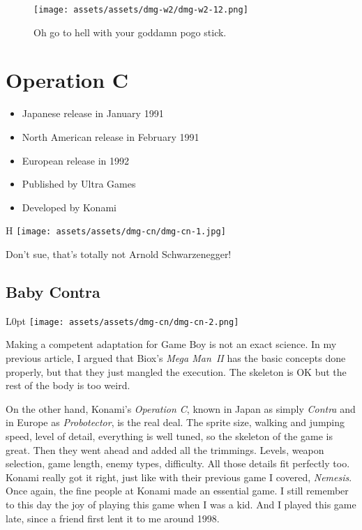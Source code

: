 \documentclass{book}
\begin{document}
\begin{figure}[hbt]
\vskip 10pt
\centering \texttt{[image: assets/assets/dmg-w2/dmg-w2-12.png]}\par\pagetwodescription Oh go to hell with your goddamn pogo stick.
\vskip 6pt
\end{figure}


\begingroup \chapter*{Operation C} \endgroup

\begin{itemize} \setlength\itemsep{-0.4em}
\item Japanese release in January 1991
\item North American release in February 1991
\item European release in 1992
\item Published by Ultra Games
\item Developed by Konami
\end{itemize}\noindent

\begin{wrapfigure}{H}{\linewidth}
\vskip 4pt
\centering \texttt{[image: assets/assets/dmg-cn/dmg-cn-1.jpg]}\par\pagetwodescription Don’t sue, that’s totally not Arnold Schwarzenegger!\end{wrapfigure}
\clearpage

\FloatBarrier\needspace{5pt}\section*{Baby Contra}\nopagebreak[4]

\begin{wrapfigure}{L}{0pt} \texttt{[image: assets/assets/dmg-cn/dmg-cn-2.png]}\end{wrapfigure}
Making a competent adaptation for Game Boy is not an exact science. In my previous article, I argued that Biox’s \emph{Mega Man II} has the basic concepts done properly, but that they just mangled the execution. The skeleton is OK but the rest of the body is too weird.

On the other hand, Konami’s \emph{Operation C}, known in Japan as simply \emph{Contra} and in Europe as \emph{Probotector}, is the real deal. The sprite size, walking and jumping speed, level of detail, everything is well tuned, so the skeleton of the game is great. Then they went ahead and added all the trimmings. Levels, weapon selection, game length, enemy types, difficulty. All those details fit perfectly too. Konami really got it right, just like with their previous game I covered, \emph{Nemesis}. Once again, the fine people at Konami made an essential game. I still remember to this day the joy of playing this game when I was a kid. And I played this game late, since a friend first lent it to me around 1998.
\end{document}
